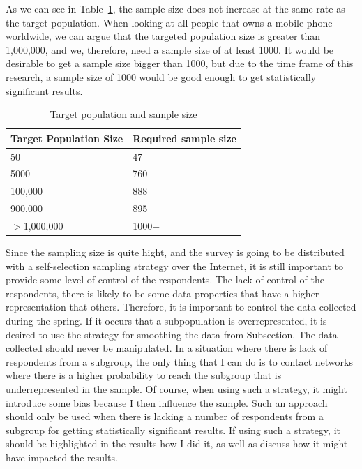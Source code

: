     As we can see in Table~\ref{tab:sampleSize}, the sample size does not increase at the same rate as the target population. When looking at all people that owns a mobile phone worldwide, we can argue that the targeted population size is greater than 1,000,000, and we, therefore, need a sample size of at least 1000. It would be desirable to get a sample size bigger than 1000, but due to the time frame of this research, a sample size of 1000 would be good enough to get statistically significant results.

      \begin{table}[H]
      	\centering
        \begin{tabular}{| p{5cm} | p{5cm} |}
          \hline
          {\bf Target Population Size} & {\bf Required sample size} \\ \hline
          50 & 47 \\
          5000 & 760 \\ 
          100,000 & 888 \\
          900,000 & 895 \\ 
          $>$1,000,000 & 1000+ \\ \hline
        \end{tabular}
        \caption{Target population and sample size \cite{empiriske}}
        \label{tab:sampleSize}
      \end{table}

    Since the sampling size is quite hight, and the survey is going to be distributed with a self-selection sampling strategy over the Internet, it is still important to provide some level of control of the respondents. The lack of control of the respondents, there is likely to be some data properties that have a higher representation that others. Therefore, it is important to control the data collected during the spring. If it occurs that a subpopulation is overrepresented, it is desired to use the strategy for smoothing the data from Subsection. The data collected should never be manipulated. In a situation where there is lack of respondents from a subgroup, the only thing that I can do is to contact networks where there is a higher probability to reach the subgroup that is underrepresented in the sample. Of course, when using such a strategy, it might introduce some bias because I then influence the sample. Such an approach should only be used when there is lacking a number of respondents from a subgroup for getting statistically significant results. If using such a strategy, it should be highlighted in the results how I did it, as well as discuss how it might have impacted the results. 

